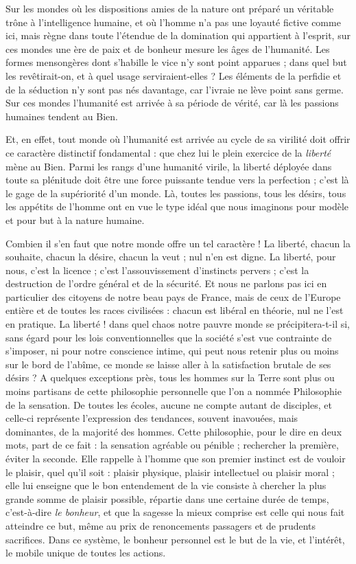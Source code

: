 \documentclass[a4paper, 11pt, oneside, landscape]{article}
\begin{document}
Sur les mondes où les dispositions amies de la nature ont préparé un véritable trône à l'intelligence humaine, et où l'homme n'a pas une loyauté fictive comme ici, mais règne dans toute l'étendue de la domination qui appartient à l'esprit, sur ces mondes une ère de paix et de bonheur mesure les âges de l'humanité. Les formes mensongères dont s'habille le vice n'y sont point apparues ; dans quel but les revêtirait-on, et à quel usage serviraient-elles ? Les éléments de la perfidie et de la séduction n'y sont pas nés davantage, car l'ivraie ne lève point sans germe. Sur ces mondes l'humanité est arrivée à sa période de vérité, car là les passions humaines tendent au Bien.

Et, en effet, tout monde où l'humanité est arrivée au cycle de sa virilité doit offrir ce caractère distinctif fondamental : que chez lui le plein exercice de la \emph{liberté} mène au Bien. Parmi les rangs d'une humanité virile, la liberté déployée dans toute sa plénitude doit être une force puissante tendue vers la perfection ; c'est là le gage de la supériorité d'un monde. Là, toutes les passions, tous les désirs, tous les appétits de l'homme ont en vue le type idéal que nous imaginons pour modèle et pour but à la nature humaine.

Combien il s'en faut que notre monde offre un tel caractère ! La liberté, chacun la souhaite, chacun la désire, chacun la veut ; nul n'en est digne. La liberté, pour nous, c'est la licence ; c'est l'assouvissement d'instincts pervers ; c'est la destruction de l'ordre général et de la sécurité. Et nous ne parlons pas ici en particulier des citoyens de notre beau pays de France, mais de ceux de l'Europe entière et de toutes les races civilisées : chacun est libéral en théorie, nul ne l'est en pratique. La liberté ! dans quel chaos notre pauvre monde se précipitera-t-il si, sans égard pour les lois conventionnelles que la société s'est vue contrainte de s'imposer, ni pour notre conscience intime, qui peut nous retenir plus ou moins sur le bord de l'abîme, ce monde se laisse aller à la satisfaction brutale de ses désirs ? A quelques exceptions près, tous les hommes sur la Terre sont plus ou moins partisans de cette philosophie personnelle que l'on a nommée Philosophie de la sensation. De toutes les écoles, aucune ne compte autant de disciples, et celle-ci représente l'expression des tendances, souvent inavouées, mais dominantes, de la majorité des hommes. Cette philosophie, pour le dire en deux mots, part de ce fait : la sensation agréable ou pénible ; rechercher la première, éviter la seconde. Elle rappelle à l'homme que son premier instinct est de vouloir le plaisir, quel qu'il soit : plaisir physique, plaisir intellectuel ou plaisir moral ; elle lui enseigne que le bon entendement de la vie consiste à chercher la plus grande somme de plaisir possible, répartie dans une certaine durée de temps, c'est-à-dire \emph{le bonheur}, et que la sagesse la mieux comprise est celle qui nous fait atteindre ce but, même au prix de renoncements passagers et de prudents sacrifices. Dans ce système, le bonheur personnel est le but de la vie, et l'intérêt, le mobile unique de toutes les actions.
\end{document}
